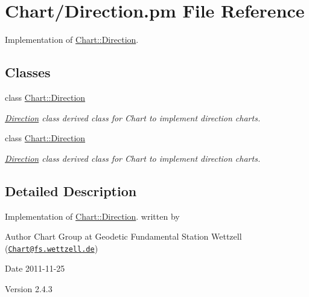 \hypertarget{Direction_8pm}{
\section{Chart/Direction.pm File Reference}
\label{Direction_8pm}
}


Implementation of \hyperlink{classChart_1_1Direction}{Chart::Direction}.  


\subsection*{Classes}
\begin{DoxyCompactItemize}
\item 
class \hyperlink{classChart_1_1Direction}{Chart::Direction}
\begin{DoxyCompactList}\small\item\em \hyperlink{classChart_1_1Direction}{Direction} class derived class for Chart to implement direction charts. \item\end{DoxyCompactList}\item 
class \hyperlink{classChart_1_1Direction}{Chart::Direction}
\begin{DoxyCompactList}\small\item\em \hyperlink{classChart_1_1Direction}{Direction} class derived class for Chart to implement direction charts. \item\end{DoxyCompactList}\end{DoxyCompactItemize}


\subsection{Detailed Description}
Implementation of \hyperlink{classChart_1_1Direction}{Chart::Direction}. written by \begin{DoxyAuthor}{Author}
Chart Group at Geodetic Fundamental Station Wettzell (\href{mailto:Chart@fs.wettzell.de}{\tt Chart@fs.wettzell.de}) 
\end{DoxyAuthor}
\begin{DoxyDate}{Date}
2011-\/11-\/25 
\end{DoxyDate}
\begin{DoxyVersion}{Version}
2.4.3 
\end{DoxyVersion}
